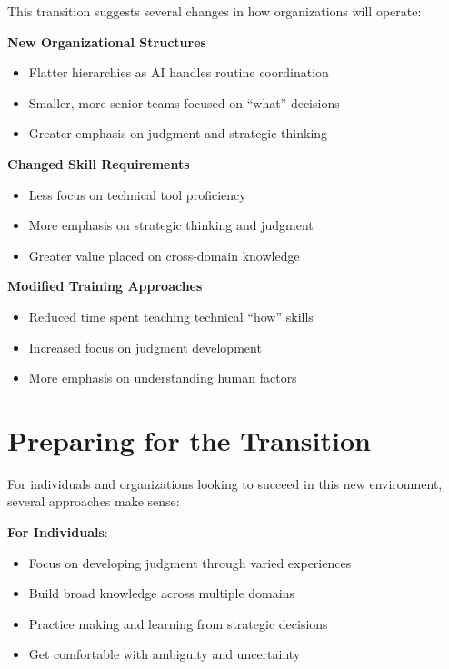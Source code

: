 \documentclass[
  Letterpaper,
]{scrbook}
\providecommand{\tightlist}{%
  \setlength{\itemsep}{0pt}\setlength{\parskip}{0pt}}\usepackage{longtable,booktabs,array}
\begin{document}
This transition suggests several changes in how organizations will
operate:

\textbf{New Organizational Structures}

\begin{itemize}
\tightlist
\item
  Flatter hierarchies as AI handles routine coordination
\item
  Smaller, more senior teams focused on ``what'' decisions
\item
  Greater emphasis on judgment and strategic thinking
\end{itemize}

\textbf{Changed Skill Requirements}

\begin{itemize}
\tightlist
\item
  Less focus on technical tool proficiency
\item
  More emphasis on strategic thinking and judgment
\item
  Greater value placed on cross-domain knowledge
\end{itemize}

\textbf{Modified Training Approaches}

\begin{itemize}
\tightlist
\item
  Reduced time spent teaching technical ``how'' skills
\item
  Increased focus on judgment development
\item
  More emphasis on understanding human factors
\end{itemize}

\section{Preparing for the
Transition}\label{preparing-for-the-transition}

For individuals and organizations looking to succeed in this new
environment, several approaches make sense:

\textbf{For Individuals}:

\begin{itemize}
\tightlist
\item
  Focus on developing judgment through varied experiences
\item
  Build broad knowledge across multiple domains
\item
  Practice making and learning from strategic decisions
\item
  Get comfortable with ambiguity and uncertainty
\end{itemize}
\end{document}
